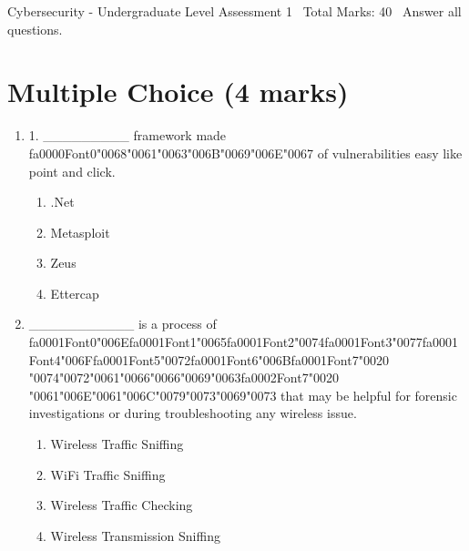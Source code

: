 \documentclass[12pt]{article}
\begin{document}
\begin{center}
Cybersecurity - Undergraduate Level Assessment 1 \
Total Marks: 40 \
Answer all questions.
\end{center}

\section*{Multiple Choice (4 marks)}
\begin{enumerate}[label=\arabic*.]
\item 1. \_\_\_\_\_\_\_\_\_ framework made {\csname fa0000Font0\endcsname\char"0068}{\char"0061}{\char"0063}{\char"006B}{\char"0069}{\char"006E}{\char"0067} of vulnerabilities easy like point and click.
\begin{enumerate}[label=(\alph*)]
    \item .Net
    \item Metasploit
    \item Zeus
    \item Ettercap
\end{enumerate}
\item \_\_\_\_\_\_\_\_\_\_\_ is a process of {\csname fa0001Font0\endcsname\char"006E}{\csname fa0001Font1\endcsname\char"0065}{\csname fa0001Font2\endcsname\char"0074}{\csname fa0001Font3\endcsname\char"0077}{\csname fa0001Font4\endcsname\char"006F}{\csname fa0001Font5\endcsname\char"0072}{\csname fa0001Font6\endcsname\char"006B}{\csname fa0001Font7\endcsname\char"0020} {\char"0074}{\char"0072}{\char"0061}{\char"0066}{\char"0066}{\char"0069}{\char"0063}{\csname fa0002Font7\endcsname\char"0020} {\char"0061}{\char"006E}{\char"0061}{\char"006C}{\char"0079}{\char"0073}{\char"0069}{\char"0073} that may be helpful for forensic investigations or during troubleshooting any wireless issue.
\begin{enumerate}[label=(\alph*)]
    \item Wireless Traffic Sniffing
    \item WiFi Traffic Sniffing
    \item Wireless Traffic Checking
    \item Wireless Transmission Sniffing
\end{enumerate}
\end{enumerate}
\end{document}
